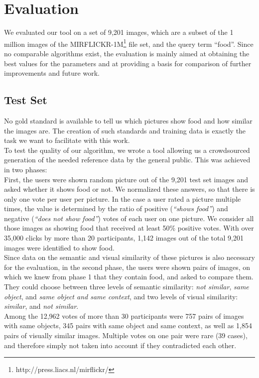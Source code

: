 %
\section{Evaluation}
\label{sec_evaluation}

We evaluated our tool on a set of 9,201 images, which are a subset of the 1 million images of the MIRFLICKR-1M\footnote{http://press.liacs.nl/mirflickr/} file set, and the query term ``food''. Since no comparable algorithms exist, the evaluation is mainly aimed at obtaining the best values for the parameters and at providing a basis for comparison of further improvements and future work.

\subsection{Test Set}
\label{sec_testset}
No gold standard is available to tell us which pictures show food and how similar the images are. The creation of such standards and training data is exactly the task we want to facilitate with this work.\\ 
To test the quality of our algorithm, we wrote a tool allowing us a crowdsourced generation of the needed reference data by the general public. This was achieved in two phases:\\

First, the users were shown random picture out of the 9,201 test set images and asked whether it shows food or not. We normalized these answers, so that there is only one vote per user per picture. In the case a user rated a picture multiple times, the value is determined by the ratio of positive (\emph{``shows food''}) and negative (\emph{``does not show food''}) votes of each user on one picture. We consider all those images as showing food that received at least 50\% positive votes. With over 35,000 clicks by more than 20 participants, 1,142 images out of the total 9,201 images were identified to show food. \\

Since data on the semantic and visual similarity of these pictures is also necessary for the evaluation, in the second phase, the users were shown pairs of images, on which we knew from phase 1 that they contain food, and asked to compare them. They could choose between three levels of semantic similarity: \emph{not similar}, \emph{same object}, and \emph{same object and same context}, and two levels of visual similarity: \emph{similar}, and \emph{not similar}.\\
Among the 12,962 votes of more than 30 participants were 757 pairs of images with same objects, 345 pairs with same object and same context, as well as 1,854 pairs of visually similar images. Multiple votes on one pair were rare (39 cases), and therefore simply not taken into account if they contradicted each other.

